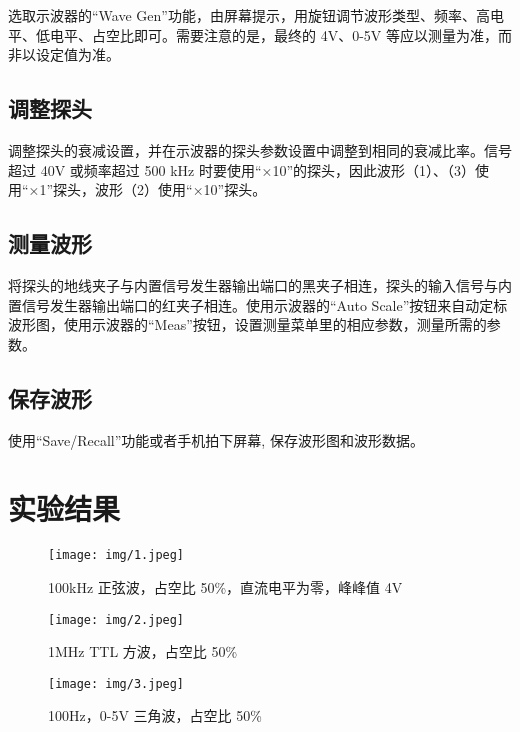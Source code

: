 \documentclass[a4paper]{article}
\begin{document}
选取示波器的“Wave Gen”功能，由屏幕提示，用旋钮调节波形类型、频率、高电平、低电平、占空比即可。需要注意的是，最终的 4V、0-5V 等应以测量为准，而非以设定值为准。

\subsection{调整探头}

调整探头的衰减设置，并在示波器的探头参数设置中调整到相同的衰减比率。信号超过 40V 或频率超过 500 kHz 时要使用“×10”的探头，因此波形（1）、（3）使用“×1”探头，波形（2）使用“×10”探头。

\subsection{测量波形}

将探头的地线夹子与内置信号发生器输出端口的黑夹子相连，探头的输入信号与内置信号发生器输出端口的红夹子相连。使用示波器的“Auto Scale”按钮来自动定标波形图，使用示波器的“Meas”按钮，设置测量菜单里的相应参数，测量所需的参数。

\subsection{保存波形}

使用“Save/Recall”功能或者手机拍下屏幕, 保存波形图和波形数据。

\section{实验结果}

\begin{figure}
    \texttt{[image: img/1.jpeg]}
    \caption{100kHz 正弦波，占空比 50\%，直流电平为零，峰峰值 4V}
\end{figure}

\begin{figure}
    \texttt{[image: img/2.jpeg]}
    \caption{1MHz TTL 方波，占空比 50\%}
\end{figure}

\begin{figure}
    \texttt{[image: img/3.jpeg]}
    \caption{100Hz，0-5V 三角波，占空比 50\%}
\end{figure}
\end{document}
